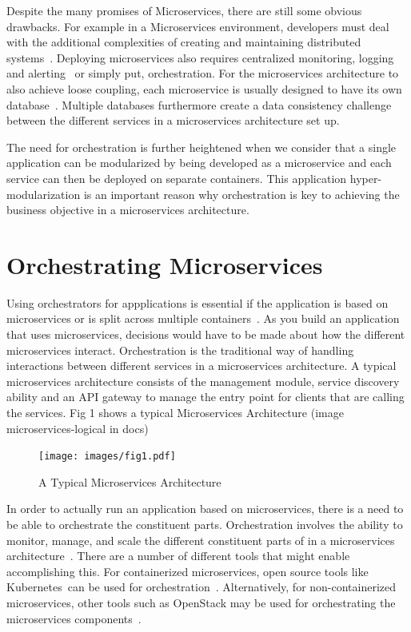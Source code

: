 Despite the many promises of Microservices, there are still some
obvious drawbacks. For example in a Microservices environment,
developers must deal with the additional complexities of creating and
maintaining distributed
systems~\cite{hid-sp18-501-patterns}. Deploying microservices also
requires centralized monitoring, logging and
alerting~\cite{hid-sp18-501-challenges} or simply put,
orchestration. For the microservices architecture to also achieve
loose coupling, each microservice is usually designed to have its own
database~\cite{hid-sp18-501-patterns}. Multiple databases furthermore
create a data consistency challenge between the different services in
a microservices architecture set up.

The need for orchestration is further heightened when we consider that
a single application can be modularized by being developed as a
microservice and each service can then be deployed on separate
containers. This application hyper-modularization is an important
reason why orchestration is key to achieving the business objective in
a microservices architecture.


\section{Orchestrating Microservices}
Using orchestrators for appplications is essential if the application
is based on microservices or is split across multiple
containers~\cite{hid-sp18-501-dotnet}. As you build an application
that uses microservices, decisions would have to be made about how the
different microservices interact. Orchestration is the traditional way
of handling interactions between different services in a microservices
architecture. A typical microservices architecture consists of the
management module, service discovery ability and an API gateway to
manage the entry point for clients that are calling the services.  Fig
1 shows a typical Microservices Architecture (image
microservices-logical in docs)

\begin{figure}[!ht]
  \centering\texttt{[image: images/fig1.pdf]}
  \caption{A Typical Microservices Architecture}
\label{f:architecture}
\end{figure}

In order to actually run an application based on microservices, there
is a need to be able to orchestrate the constituent
parts. Orchestration involves the ability to monitor, manage, and
scale the different constituent parts of in a microservices
architecture~\cite{hid-sp18-501-opensource}. There are a number of
different tools that might enable accomplishing this. For
containerized microservices, open source tools like Kubernetes can be
used for orchestration~\cite{hid-sp18-501-onfido}. Alternatively, for
non-containerized microservices, other tools such as OpenStack may be
used for orchestrating the microservices
components~\cite{hid-sp18-501-rackspace}.

